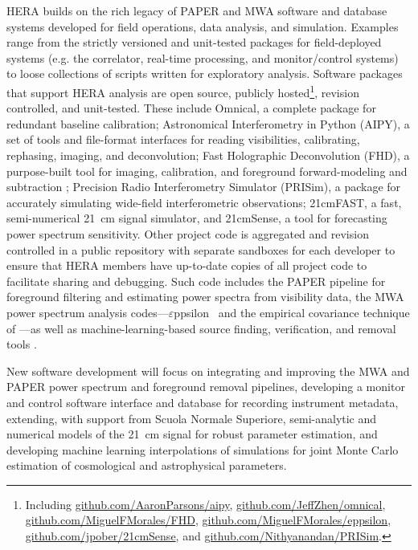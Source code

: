 \documentclass[preprint,11pt]{aastex}
\def\eppsilon{{$\varepsilon$ppsilon}}
\begin{document}
\noindent HERA builds on the rich legacy of PAPER and MWA software and database systems 
developed for field operations, data analysis, and simulation.  Examples range from
the strictly versioned and unit-tested packages for field-deployed systems (e.g. the correlator, real-time processing, and
monitor/control systems) to loose collections of scripts written for exploratory analysis.
Software packages that support HERA analysis are open source, publicly 
hosted\footnote{Including \url{github.com/AaronParsons/aipy}, \url{github.com/JeffZhen/omnical}, 
\url{github.com/MiguelFMorales/FHD}, \url{github.com/MiguelFMorales/eppsilon}, \url{github.com/jpober/21cmSense},
and \url{github.com/Nithyanandan/PRISim}.}, revision controlled, and unit-tested.  
These include Omnical, a complete package for redundant baseline calibration;
Astronomical Interferometry in Python (AIPY), a set of
tools and file-format interfaces for reading visibilities, calibrating,
rephasing, imaging, and deconvolution; Fast Holographic Deconvolution
(FHD), a purpose-built tool for imaging, calibration, and foreground
forward-modeling and subtraction \citep{sullivan_et_al2012}; Precision Radio Interferometry Simulator 
(PRISim), a package for accurately simulating wide-field interferometric observations;
21cmFAST, a fast, semi-numerical 21~cm signal simulator,
and 21cmSense, a tool for forecasting power spectrum sensitivity.
Other project code is aggregated and revision
controlled in a public repository with separate sandboxes for each developer to ensure that
HERA members have up-to-date copies of all project code to facilitate sharing and debugging.
Such code includes the PAPER pipeline for foreground filtering and estimating power spectra from
visibility data,
the MWA power spectrum analysis codes---\eppsilon\ \citep{hazelton_et_al2016} and the 
empirical covariance technique of \citet{dillon_et_al2015}---as well as
machine-learning-based source finding, verification, and removal tools \citep{caroll_et_al2016,jacobs_et_al2016,beardsley_et_al2016}. 


New software development will focus on integrating and improving the MWA and PAPER power spectrum and foreground removal pipelines,
developing a monitor and control software interface and database for recording instrument metadata,
extending, with support from Scuola Normale Superiore, semi-analytic and numerical models 
of the 21~cm signal for robust parameter estimation, and developing
machine learning interpolations of simulations for joint Monte Carlo estimation of cosmological and astrophysical parameters.
\end{document}
